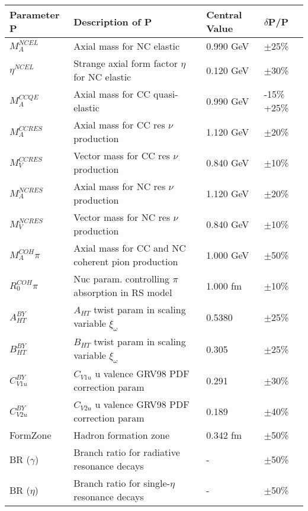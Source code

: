 \begin{table*}
\centering
{}
\begin{tabular}{| l | l | l | l |}
\hline
   Parameter P & Description of P & Central Value  & $\delta$P/P \\ [0.1ex] \hline
 $M_A^{NCEL}$  & Axial mass for NC elastic & 0.990 GeV & $\pm$25\% \\
 $\eta^{NCEL}$  & Strange axial form factor $\eta$ for NC elastic & 0.120 GeV & $\pm$30\% \\
$M_A^{CCQE}$  & Axial mass for CC quasi-elastic & 0.990 GeV & -15\% +25\% \\
$M_A^{CCRES}$  & Axial mass for CC res $\nu$ production & 1.120 GeV & $\pm$20\% \\
$M_V^{CCRES}$  & Vector mass for CC res $\nu$ production & 0.840 GeV & $\pm$10\% \\
$M_A^{NCRES}$  & Axial mass for NC res $\nu$ production & 1.120 GeV & $\pm$20\% \\
$M_V^{NCRES}$  & Vector mass for NC res $\nu$ production & 0.840 GeV & $\pm$10\% \\
$M_A^{COH}\pi$  & Axial mass for CC and NC coherent pion production & 1.000 GeV & $\pm$50\% \\
$R_0^{COH}\pi$  & Nuc param. controlling $\pi$ absorption in RS model & 1.000 fm & $\pm$10\% \\ \hline

$A_{HT}^{BY}$  & $A_{HT}$ twist param in scaling variable $\xi_\omega$ & 0.5380 & $\pm$25\% \\
$B_{HT}^{BY}$  & $B_{HT}$ twist param in scaling variable $\xi_\omega$ & 0.305 & $\pm$25\% \\
$C_{V1u}^{BY}$  & $C_{V1u}$ u valence GRV98 PDF correction param & 0.291 & $\pm$30\% \\
$C_{V2u}^{BY}$  & $C_{V2u}$ u valence GRV98 PDF correction param & 0.189 & $\pm$40\% \\ \hline

FormZone  & Hadron formation zone & 0.342 fm & $\pm$50\% \\
BR ($\gamma$)  & Branch ratio for radiative resonance decays & - & $\pm$50\% \\
BR ($\eta$)  & Branch ratio for single-$\eta$ resonance decays & - & $\pm$50\% \\ \hline


\end{tabular}
\end{table*}

